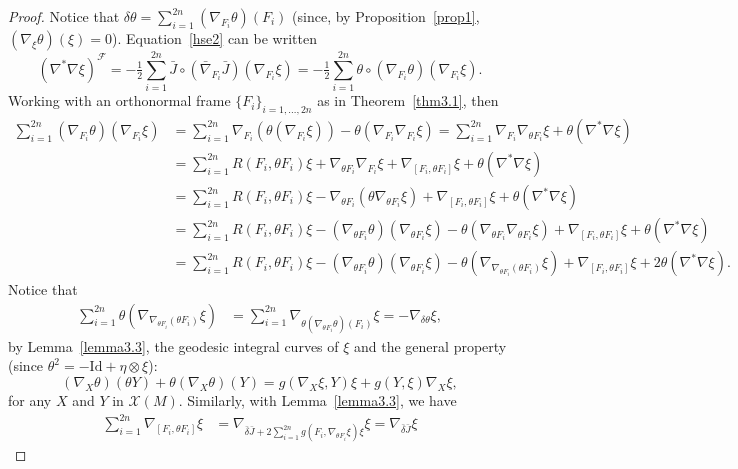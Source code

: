 \documentclass[a4paper,reqno]{amsart}
\theoremstyle{definition}
\theoremstyle{remark}
\theoremstyle{plain}
\numberwithin{equation}{section}
\newcommand{\calX}{{\mathcal{X}}}
\begin{document}
\begin{proof} 
  Notice that
  $\delta\theta= \sum_{i=1}^{2n}(\nabla_{F_i}\theta)(F_i)$
  (since, by Proposition~\ref{prop1},
  $(\nabla_{\xi}\theta)(\xi)=0$).  Equation~\eqref{hse2} can be
  written
  $$
  (\nabla^*\nabla \xi)^{\mathcal{F}}=-\tfrac{1}{2}\sum_{i=1}^{2n}\bar{J}\circ (\bar{\nabla}_{F_i} \bar{J})(\nabla_{F_i} \xi)=
-\tfrac{1}{2}\sum_{i=1}^{2n}\theta\circ (\nabla_{F_i}
\theta)(\nabla_{F_i} \xi).
$$
Working with an orthonormal frame $\{F_i\}_{i=1,\dots, 2n}$ as in
Theorem~\ref{thm3.1}, then \label{page:9} 
\begin{align*}
\sum_{i=1}^{2n}(\nabla_{F_i} \theta)(\nabla_{F_i} \xi) & = \sum_{i=1}^{2n}\nabla_{F_i} (\theta (\nabla_{F_i} \xi)) -\theta (\nabla_{F_i}\nabla_{F_i} \xi)
 = \sum_{i=1}^{2n}\nabla_{F_i}\nabla_{\theta F_i}\xi + \theta (\nabla^* \nabla \xi)\\
&= \sum_{i=1}^{2n}R(F_i,\theta F_i)\xi +\nabla_{\theta F_i} \nabla_{F_i}\xi + \nabla_{[F_i,\theta F_i]}\xi + \theta (\nabla^* \nabla \xi)\\
&= \sum_{i=1}^{2n}R(F_i,\theta F_i)\xi -\nabla_{\theta F_i} (\theta \nabla_{\theta F_i}\xi) + \nabla_{[F_i,\theta F_i]}\xi + \theta (\nabla^* \nabla \xi)\\
&=\sum_{i=1}^{2n} R(F_i,\theta F_i)\xi -(\nabla_{\theta F_i}
  \theta) (\nabla_{\theta F_i}\xi) -\theta (\nabla_{\theta
  F_i}\nabla_{\theta F_i}\xi) +\nabla_{[F_i,\theta F_i]}\xi + \theta (\nabla^* \nabla \xi)\\
&= \sum_{i=1}^{2n}R(F_i,\theta F_i)\xi - (\nabla_{\theta F_i} \theta)(\nabla_{\theta F_i}\xi) -\theta (\nabla_{\nabla_{\theta F_i}(\theta F_i)}\xi) 
+\nabla_{[F_i,\theta F_i]}\xi + 2\theta (\nabla^* \nabla \xi).
\end{align*}
Notice that 
\begin{align}
\sum_{i=1}^{2n}\theta (\nabla_{\nabla_{\theta F_i}(\theta F_i)}\xi) &= \sum_{i=1}^{2n}\nabla_{\theta (\nabla_{\theta F_i}\theta) (F_i)}\xi 
= -\nabla_{\delta \theta} \xi , \label{eqt} 
\end{align} 
by Lemma~\ref{lemma3.3}, the geodesic integral curves of $\xi$
and  the general property (since $\theta^2=- \mathrm{Id} + \eta\otimes
\xi$): 
$$
(\nabla_X \theta)(\theta Y)+ \theta(\nabla_X \theta)(Y)=
g(\nabla_X \xi, Y) \xi + g(Y, \xi) \nabla_X \xi,
$$
for any $X$ and $Y$ in $\calX(M)$.
Similarly, with Lemma~\ref{lemma3.3}, we have
\begin{align*}
\sum_{i=1}^{2n}\nabla_{[F_i,\theta F_i]}\xi &= \nabla_{\bar{\delta}\bar{J} +2 \sum_{i=1}^{2n}g( F_i, \nabla_{\theta F_i}\xi) \xi} \xi = \nabla_{\bar{\delta}\bar{J}} \xi 

\end{align*}
\end{proof}
\end{document}
